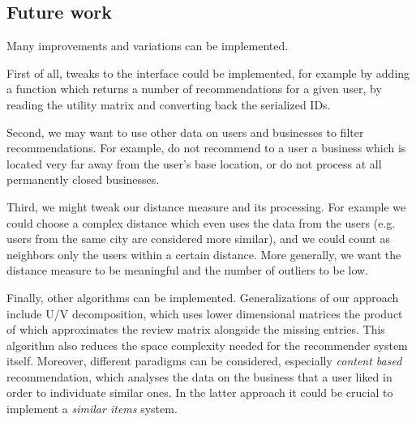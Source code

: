 \documentclass[11pt,a4paper]{article}
\begin{document}
\begin{multicols}{2}
\section{Future work}\label{futurework}
Many improvements and variations can be implemented.

First of all, tweaks to the interface could be implemented, for example by adding a function which returns a number of recommendations for a given user, by reading the utility matrix and converting back the serialized IDs.

Second, we may want to use other data on users and businesses to filter recommendations.
For example, do not recommend to a user a business which is located very far away from the user's base location, or do not process at all permanently closed businesses.

Third, we might tweak our distance measure and its processing.
For example we could choose a complex distance which even uses the data from the users (e.g. users from the same city are considered more similar), and we could count  as neighbors only the users within a certain distance.
More generally, we want the distance measure to be meaningful and the number of outliers to be low.

Finally, other algorithms can be implemented.
Generalizations of our approach include U/V decomposition, which uses lower dimensional matrices the product of which approximates the review matrix alongside the missing entries.
This algorithm also reduces the space complexity needed for the recommender system itself.
Moreover, different paradigms can be considered, especially \emph{content based} recommendation, which analyses the data on the business that a user liked in order to individuate similar ones.
In the latter approach it could be crucial to implement a \emph{similar items} system.


\end{multicols}
\end{document}
